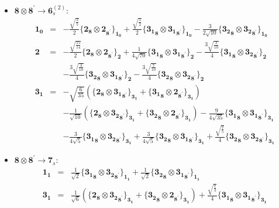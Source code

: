 \documentclass[english]{article}
\newcommand{\subcg}[3]{\big\{ {#1}\otimes{#2}\big\}^{}_{#3}}
\newcommand{\rep}[1]{\mathbf{#1}}
\begin{document}
\begin{itemize}
\begin{eqnarray*}
\end{eqnarray*}
\item $\rep{8}\otimes\rep{8}^{\prime}\to\rep{6}_{s}^{(2)}$:
\begin{eqnarray*}
\rep{1_0} &=& -\frac{\sqrt{\frac{3}{5}}}{2}\subcg{\rep{2}_{\rep{8}}}{\rep{2}_{\rep{8}^{\prime}}}{\rep{1_0}}+\frac{\sqrt{\frac{5}{2}}}{2}\subcg{\rep{3_1}_{\rep{8}}}{\rep{3_1}_{\rep{8}^{\prime}}}{\rep{1_0}}-\frac{3}{2 \sqrt{10}}\subcg{\rep{3_2}_{\rep{8}}}{\rep{3_2}_{\rep{8}^{\prime}}}{\rep{1_0}}
\\
\rep{2} &=& -\frac{\sqrt{\frac{15}{14}}}{2}\subcg{\rep{2}_{\rep{8}}}{\rep{2}_{\rep{8}^{\prime}}}{\rep{2}}+\frac{1}{4 \sqrt{70}}\subcg{\rep{3_1}_{\rep{8}}}{\rep{3_1}_{\rep{8}^{\prime}}}{\rep{2}}-\frac{3 \sqrt{\frac{3}{10}}}{4}\subcg{\rep{3_1}_{\rep{8}}}{\rep{3_2}_{\rep{8}^{\prime}}}{\rep{2}} \\ 
 & & -\frac{3 \sqrt{\frac{3}{10}}}{4}\subcg{\rep{3_2}_{\rep{8}}}{\rep{3_1}_{\rep{8}^{\prime}}}{\rep{2}}-\frac{3 \sqrt{\frac{7}{10}}}{4}\subcg{\rep{3_2}_{\rep{8}}}{\rep{3_2}_{\rep{8}^{\prime}}}{\rep{2}}
\\
\rep{3_1} &=& -\sqrt{\frac{6}{35}}\left(\subcg{\rep{2}_{\rep{8}}}{\rep{3_1}_{\rep{8}^{\prime}}}{\rep{3_1}}+\subcg{\rep{3_1}_{\rep{8}}}{\rep{2}_{\rep{8}^{\prime}}}{\rep{3_1}}\right) \\ 
 & & -\frac{1}{\sqrt{10}}\left(\subcg{\rep{2}_{\rep{8}}}{\rep{3_2}_{\rep{8}^{\prime}}}{\rep{3_1}}+\subcg{\rep{3_2}_{\rep{8}}}{\rep{2}_{\rep{8}^{\prime}}}{\rep{3_1}}\right)-\frac{9}{4 \sqrt{35}}\subcg{\rep{3_1}_{\rep{8}}}{\rep{3_1}_{\rep{8}^{\prime}}}{\rep{3_1}} \\ 
 & & -\frac{3}{4 \sqrt{5}}\subcg{\rep{3_1}_{\rep{8}}}{\rep{3_2}_{\rep{8}^{\prime}}}{\rep{3_1}}+\frac{3}{4 \sqrt{5}}\subcg{\rep{3_2}_{\rep{8}}}{\rep{3_1}_{\rep{8}^{\prime}}}{\rep{3_1}}+\frac{\sqrt{\frac{7}{5}}}{4}\subcg{\rep{3_2}_{\rep{8}}}{\rep{3_2}_{\rep{8}^{\prime}}}{\rep{3_1}}
\end{eqnarray*}
\item $\rep{8}\otimes\rep{8}^{\prime}\to\rep{7}_{s}$:
\begin{eqnarray*}
\rep{1_1} &=& \frac{1}{\sqrt{2}}\subcg{\rep{3_1}_{\rep{8}}}{\rep{3_2}_{\rep{8}^{\prime}}}{\rep{1_1}}+\frac{1}{\sqrt{2}}\subcg{\rep{3_2}_{\rep{8}}}{\rep{3_1}_{\rep{8}^{\prime}}}{\rep{1_1}}
\\
\rep{3_1} &=& \frac{1}{\sqrt{6}}\left(\subcg{\rep{2}_{\rep{8}}}{\rep{3_2}_{\rep{8}^{\prime}}}{\rep{3_1}}+\subcg{\rep{3_2}_{\rep{8}}}{\rep{2}_{\rep{8}^{\prime}}}{\rep{3_1}}\right)+\frac{\sqrt{\frac{7}{3}}}{4}\subcg{\rep{3_1}_{\rep{8}}}{\rep{3_1}_{\rep{8}^{\prime}}}{\rep{3_1}} \\ 

\end{eqnarray*}
\end{itemize}
\end{document}
